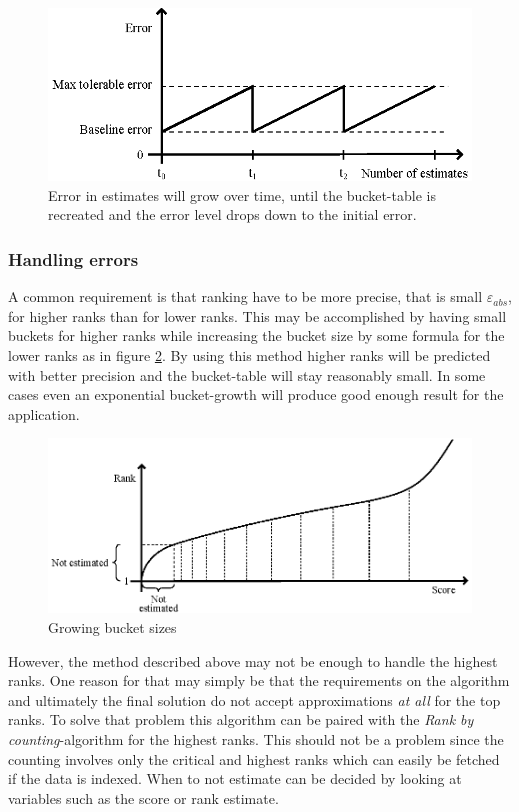 \begin{figure}[h]
  \centering
  \caption{Error in estimates will grow over time, until the bucket-table is recreated and the error level drops down to the initial error.
  }
  \label{fig:errortime}
  \includegraphics[width=13cm]{img/error-over-time.eps}
\end{figure}

\subsubsection{Handling errors}

A common requirement is that ranking have to be more precise, that is small $\varepsilon_{abs}$, for higher ranks than for lower ranks. This may be accomplished by having small buckets for higher ranks while increasing the bucket size by some formula for the lower ranks as in figure \ref{fig:growing}.  By using this method higher ranks will be predicted with better precision and the bucket-table will stay reasonably small. In some cases even an exponential bucket-growth will produce good enough result for the application.
 
\begin{figure}[h!]
  \centering
  \caption{Growing bucket sizes}
  \label{fig:growing}
  \includegraphics[width=13cm]{img/growing_bucket_sizes.eps}
\end{figure}

However, the method described above may not be enough to handle the highest ranks. One reason for that may simply be that the requirements on the algorithm and ultimately the final solution do not accept approximations \emph{at all} for the top ranks. To solve that problem this algorithm can be paired with the \emph{Rank by counting}-algorithm for the highest ranks. This should not be a problem since  the counting involves only the critical and highest ranks which can easily be fetched if the data is indexed. When to not estimate can be decided by looking at variables such as the score or rank estimate. 

